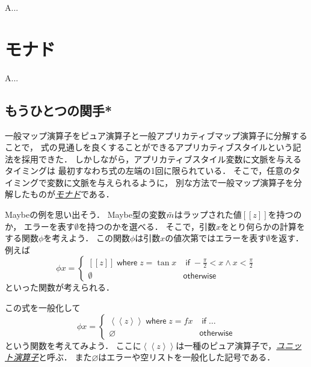 \documentclass[a5paper,draft]{jsbook}
\def\[{\left[\!\left[}
\def\]{\right]\!\right]}
\newenvironment{leader}{\begingroup}{\endgroup}
\newcommand{\keyword}[1]{{\underline{\emph{#1}}}}
\newcommand{\mathMaybeVar}[1]{\Tilde{#1}}
\newcommand{\mathMaybeWith}[1]{\[#1\]}
\newcommand{\mathUnitWith}[1]{\left\langle\!\left\langle#1\right\rangle\!\right\rangle}
\newcommand{\mathNothing}{\emptyset}
\newcommand{\mathPureNothing}{\varnothing}
\newcommand{\mathAnd}{\mathbin{\wedge}}
\newcommand{\mathKeyword}[1]{\operatorname{\textsf{#1}}}
\newcommand{\mathIf}{\mathKeyword{if}}
\newcommand{\mathOtherwise}{\mathKeyword{otherwise}}
\newcommand{\mathWhere}{\mathKeyword{where}}
\begin{document}
A...



\chapter{モナド}

\begin{leader}
A...
\end{leader}


\section{もうひとつの関手*}


一般マップ演算子をピュア演算子と一般アプリカティブマップ演算子に分解することで，
式の見通しを良くすることができるアプリカティブスタイルという記法を採用できた．
しかしながら，アプリカティブスタイル変数に文脈を与えるタイミングは
最初すなわち式の左端の1回に限られている．
そこで，任意のタイミングで変数に文脈を与えられるように，
別な方法で一般マップ演算子を分解したものが\keyword{モナド}である．

Maybeの例を思い出そう．
Maybe型の変数$\mathMaybeVar{m}$はラップされた値$\mathMaybeWith{z}$を持つのか，
エラーを表す$\mathNothing$を持つのかを選べる．
そこで，引数$x$をとり何らかの計算をする関数$\phi$を考えよう．
この関数$\phi$は引数$x$の値次第ではエラーを表す$\mathNothing$を返す．
例えば
\begin{equation}
\phi x=\begin{cases}
\mathMaybeWith{z}\mathWhere z=\tan x&\mathIf -\frac{\pi}{2}<x\mathAnd x<\frac{\pi}{2}\\
\mathNothing&\mathOtherwise
\end{cases}
\end{equation}
といった関数が考えられる．

この式を一般化して
\begin{equation}
\phi x=\begin{cases}
\mathUnitWith{z}\mathWhere z=fx&\mathIf\dots\\
\mathPureNothing&\mathOtherwise
\end{cases}
\end{equation}
という関数を考えてみよう．
ここに$\mathUnitWith{z}$は一種のピュア演算子で，\keyword{ユニット演算子}と呼ぶ．
また$\mathPureNothing$はエラーや空リストを一般化した記号である．
\end{document}
